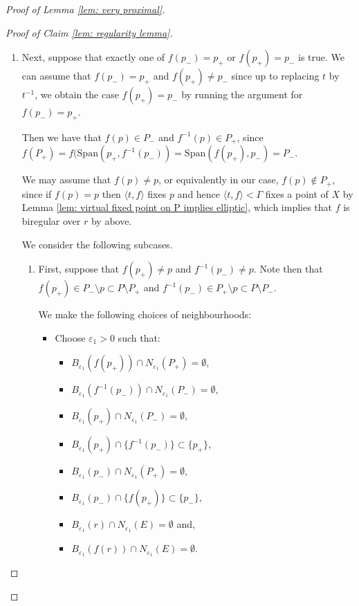 \documentclass[12pt]{article}
\theoremstyle{definition}
\newcommand{\N}{\mathbb{N}}
\newcommand{\Span}{\mathrm{Span}}
\newcommand{\ve}{\varepsilon}
\begin{document}
\begin{proof} [Proof of Lemma \ref{lem: very proximal}]
\begin{proof}[Proof of Claim \ref{lem: regularity lemma}]
\begin{enumerate}
\begin{enumerate}
    \item Next, suppose that exactly one of $f(p_-) = p_+$ or $f(p_+) = p_-$ is true. We can assume that $f(p_-) = p_+$ and $f(p_+) \neq p_-$ since up to replacing $t$ by $t^{-1}$, we obtain the case $f(p_+) = p_-$ by running the argument for $f(p_-) = p_+$.
    
    Then we have that $f(p) \in P_-$ and $f^{-1}(p) \in P_+$, since $f(P_+) = f(\Span(p_+, f^{-1}(p_-)) = \Span(f(p_+), p_-) = P_-$. 
    
    We may assume that $f(p) \neq p$, or equivalently in our case, $f(p) \notin P_+$, since if $f(p) = p$ then $\langle t,f \rangle$ fixes $p$ and hence $\langle t,f \rangle < \Gamma$ fixes a point of $X$ by Lemma \ref{lem: virtual fixed point on P implies elliptic}, which implies that $f$ is biregular over $r$ by above. 

    We consider the following subcases.

    \begin{enumerate}

    \item First, suppose that $f(p_+) \neq p$ and $f^{-1}(p_-) \neq p$. Note then that $f(p_+) \in P_- \setminus p \subset P \setminus P_+$ and $f^{-1}(p_-) \in P_+ \setminus p \subset P \setminus P_-$. %
    
    We make the following choices of neighbourhoods:

    \begin{itemize}
        \item Choose $\ve_1 > 0$ such that: 
        
        \begin{itemize}
            \item $B_{\ve_1}(f(p_+)) \cap N_{\ve_1}(P_+) = \emptyset$, \item $B_{\ve_1}(f^{-1}(p_-)) \cap N_{\ve_1}(P_-) = \emptyset$, 
            \item $B_{\ve_1}(p_+) \cap N_{\ve_1}(P_-) = \emptyset$, 
            \item $B_{\ve_1}(p_+) \cap \{f^{-1}(p_-)\} \subset \{p_+\}$, \item $B_{\ve_1}(p_-) \cap N_{\ve_1}(P_+) = \emptyset$, 
            \item $B_{\ve_1}(p_-) \cap \{f(p_+)\} \subset \{p_-\}$, 
            \item $B_{\ve_1}(r) \cap N_{\ve_1}(E) = \emptyset$ and, 
            \item $B_{\ve_1}(f(r)) \cap N_{\ve_1}(E) = \emptyset$. 
        \end{itemize}


\end{itemize}
\end{enumerate}
\end{enumerate}
\end{enumerate}
\end{proof}
\end{proof}
\end{document}
